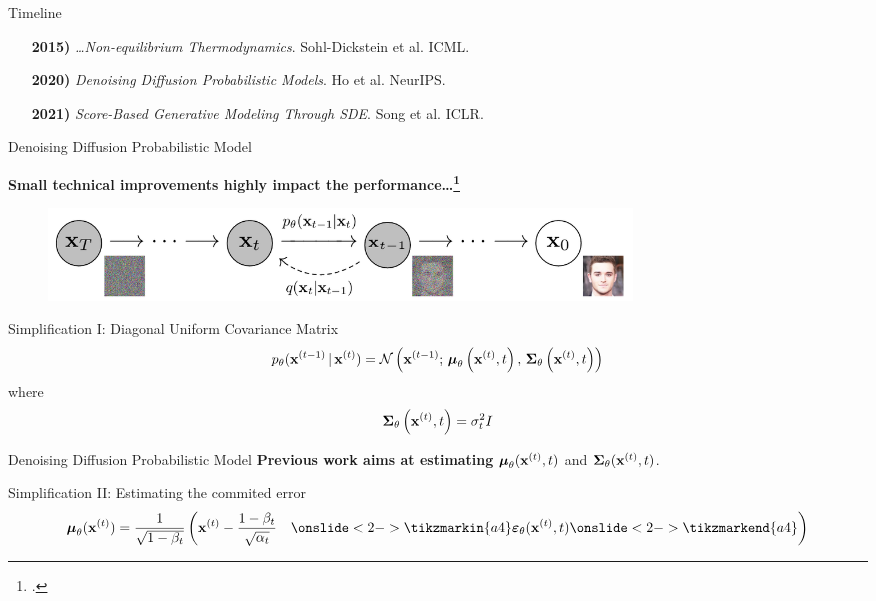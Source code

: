 \documentclass[aspectratio=169, 9pt]{beamer}
\theoremstyle{definition}
\begin{document}
\begin{frame}{Timeline}
\begin{enumerate}
  \item[\bf 2015)] \textit{\ldots Non-equilibrium
  Thermodynamics}. Sohl-Dickstein et al. ICML. {\color{ggreen} \checkmark}\vfill
  \item[\bf 2020)] \textit{Denoising Diffusion Probabilistic Models}.
  Ho et al. NeurIPS.\vfill
  \item[\bf 2021)] \textit{Score-Based Generative Modeling Through SDE}. Song et
    al. ICLR.
\end{enumerate}
\end{frame}
\begin{frame}{Denoising Diffusion Probabilistic Model}
  \begin{center}
    \bf 
    Small technical improvements highly impact the
    performance\ldots\footcite{ho}
  \end{center}
  \begin{figure}[h]
    \centering
    \includegraphics[width=0.75\textwidth]{./pic/ho_diffusion.png}
  \end{figure}
  \begin{block}{Simplification I: Diagonal Uniform Covariance
    Matrix}
    \[
      p_\theta(\mathbf{x}^{(t-1)}\,\vert\,\mathbf{x}^{(t)}) = \mathcal{N}\left(\mathbf{x}^{(t-1)};\, 
        {\boldsymbol{\mu}}_\theta\left(
        \mathbf{x}^{(t)},t \right),\, {\boldsymbol{\Sigma}}_\theta\left(\mathbf{x}^{(t)},t \right)\right)
    \]
    where
    \[
      {\boldsymbol{\Sigma}}_\theta\left( \mathbf{x}^{(t)},t  \right)= \sigma_t^2 I
    \]
  \end{block}
  \vfill
\end{frame}
\begin{frame}{Denoising Diffusion Probabilistic Model}
  \textbf{Previous work aims at estimating}
  \(
    {\boldsymbol{\mu}}_\theta(\mathbf{x}^{(t)},t)
  \) and
  \(
    {\boldsymbol{\Sigma}}_\theta(\mathbf{x}^{(t)},t)
    \).
    \begin{block}{Simplification II: Estimating the commited error}
      \[
        \mub_\theta(\xx^{(t)})= \frac{1}{\sqrt{1-\beta_t}}\left( \xx^{(t)} -
          \frac{1-\beta_t}{\sqrt{\alpha_t}}\quad\onslide<2->{\tikzmarkin{a4}}\varepsilonb_\theta(\xx^{(t)},t)\onslide<2->{\tikzmarkend{a4}}
      \right)
      \]
    \end{block}
      \vfill
\end{frame}
\end{document}
